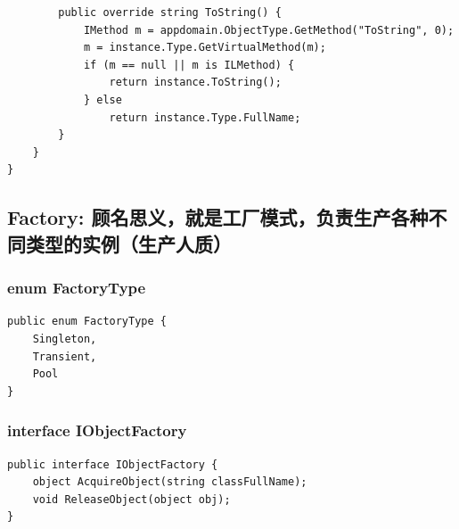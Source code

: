 \documentclass[9pt, b5paper]{article}
\begin{document}
\begin{verbatim}
        public override string ToString() {
            IMethod m = appdomain.ObjectType.GetMethod("ToString", 0);
            m = instance.Type.GetVirtualMethod(m);
            if (m == null || m is ILMethod) {
                return instance.ToString();
            } else
                return instance.Type.FullName;
        }
    }
}
\end{verbatim}
\subsection{Factory: 顾名思义，就是工厂模式，负责生产各种不同类型的实例（生产人质）}
\label{sec-5-2}
\subsubsection{enum FactoryType}
\label{sec-5-2-1}
\begin{verbatim}
public enum FactoryType {
    Singleton,
    Transient,
    Pool
}
\end{verbatim}
\subsubsection{interface IObjectFactory}
\label{sec-5-2-2}
\begin{verbatim}
public interface IObjectFactory {
    object AcquireObject(string classFullName);
    void ReleaseObject(object obj);
}
\end{verbatim}
\end{document}
